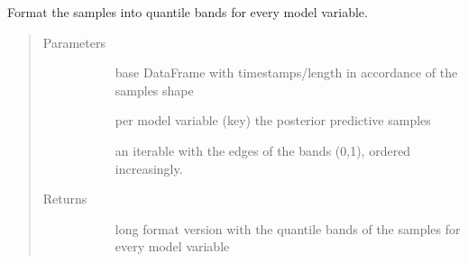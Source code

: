 \documentclass[letterpaper,10pt,english]{sphinxmanual}
\begin{document}
\begin{fulllineitems}
\label{\detokenize{autoapi/src/model/format/index:src.model.format.format_model_estimates}}
Format the samples into quantile bands for every model variable.
\begin{quote}\begin{description}
\item[{Parameters}] \leavevmode\begin{description}
\item[{}] \leavevmode{[}\sphinxcode{\sphinxupquote{pd.DataFrame}}{]}
base DataFrame with timestamps/length in accordance of the samples shape

\item[{}] \leavevmode{[}\sphinxhref{https://docs.python.org/3/library/stdtypes.html\#dict}{\sphinxcode{\sphinxupquote{dict}}}{]}
per model variable (key) the posterior predictive samples

\item[{}] \leavevmode
an iterable with the edges of the bands (0,1), ordered increasingly.

\end{description}

\item[{Returns}] \leavevmode\begin{description}
\item[{}] \leavevmode
long format version with the quantile bands of the samples for every model variable

\end{description}

\end{description}\end{quote}

\end{fulllineitems}



\subparagraph{}
\label{\detokenize{autoapi/src/model/model/index:module-src.model.model}}\label{\detokenize{autoapi/src/model/model/index:src-model-model}}\label{\detokenize{autoapi/src/model/model/index::doc}}
\end{document}
